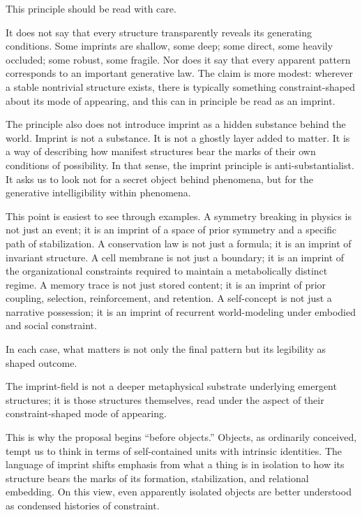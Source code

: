\documentclass[12pt]{article}
\begin{document}
This principle should be read with care.

It does not say that every structure transparently reveals its generating conditions. Some imprints are shallow, some deep; some direct, some heavily occluded; some robust, some fragile. Nor does it say that every apparent pattern corresponds to an important generative law. The claim is more modest: wherever a stable nontrivial structure exists, there is typically something constraint-shaped about its mode of appearing, and this can in principle be read as an imprint.

The principle also does not introduce imprint as a hidden substance behind the world. Imprint is not a substance. It is not a ghostly layer added to matter. It is a way of describing how manifest structures bear the marks of their own conditions of possibility. In that sense, the imprint principle is anti-substantialist. It asks us to look not for a secret object behind phenomena, but for the generative intelligibility within phenomena.

This point is easiest to see through examples. A symmetry breaking in physics is not just an event; it is an imprint of a space of prior symmetry and a specific path of stabilization. A conservation law is not just a formula; it is an imprint of invariant structure. A cell membrane is not just a boundary; it is an imprint of the organizational constraints required to maintain a metabolically distinct regime. A memory trace is not just stored content; it is an imprint of prior coupling, selection, reinforcement, and retention. A self-concept is not just a narrative possession; it is an imprint of recurrent world-modeling under embodied and social constraint.

In each case, what matters is not only the final pattern but its legibility as shaped outcome.

The imprint-field is not a deeper metaphysical substrate underlying emergent structures; it is those structures themselves, read under the aspect of their constraint-shaped mode of appearing.

This is why the proposal begins ``before objects.'' Objects, as ordinarily conceived, tempt us to think in terms of self-contained units with intrinsic identities. The language of imprint shifts emphasis from what a thing is in isolation to how its structure bears the marks of its formation, stabilization, and relational embedding. On this view, even apparently isolated objects are better understood as condensed histories of constraint.
\end{document}
